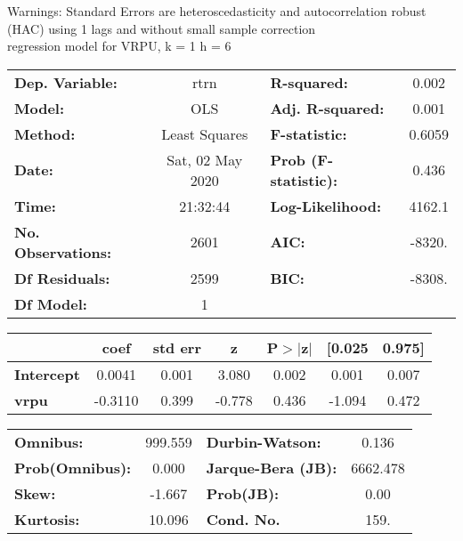Warnings: \newline
 [1] Standard Errors are heteroscedasticity and autocorrelation robust (HAC) using 1 lags and without small sample correction\\ 

regression model for VRPU, k = 1 h = 6\begin{center}
\begin{tabular}{lclc}
\toprule
\textbf{Dep. Variable:}    &       rtrn       & \textbf{  R-squared:         } &     0.002   \\
\textbf{Model:}            &       OLS        & \textbf{  Adj. R-squared:    } &     0.001   \\
\textbf{Method:}           &  Least Squares   & \textbf{  F-statistic:       } &    0.6059   \\
\textbf{Date:}             & Sat, 02 May 2020 & \textbf{  Prob (F-statistic):} &    0.436    \\
\textbf{Time:}             &     21:32:44     & \textbf{  Log-Likelihood:    } &    4162.1   \\
\textbf{No. Observations:} &        2601      & \textbf{  AIC:               } &    -8320.   \\
\textbf{Df Residuals:}     &        2599      & \textbf{  BIC:               } &    -8308.   \\
\textbf{Df Model:}         &           1      & \textbf{                     } &             \\
\bottomrule
\end{tabular}
\begin{tabular}{lcccccc}
                   & \textbf{coef} & \textbf{std err} & \textbf{z} & \textbf{P$> |$z$|$} & \textbf{[0.025} & \textbf{0.975]}  \\
\midrule
\textbf{Intercept} &       0.0041  &        0.001     &     3.080  &         0.002        &        0.001    &        0.007     \\
\textbf{vrpu}      &      -0.3110  &        0.399     &    -0.778  &         0.436        &       -1.094    &        0.472     \\
\bottomrule
\end{tabular}
\begin{tabular}{lclc}
\textbf{Omnibus:}       & 999.559 & \textbf{  Durbin-Watson:     } &    0.136  \\
\textbf{Prob(Omnibus):} &   0.000 & \textbf{  Jarque-Bera (JB):  } & 6662.478  \\
\textbf{Skew:}          &  -1.667 & \textbf{  Prob(JB):          } &     0.00  \\
\textbf{Kurtosis:}      &  10.096 & \textbf{  Cond. No.          } &     159.  \\
\bottomrule
\end{tabular}
\end{center}

